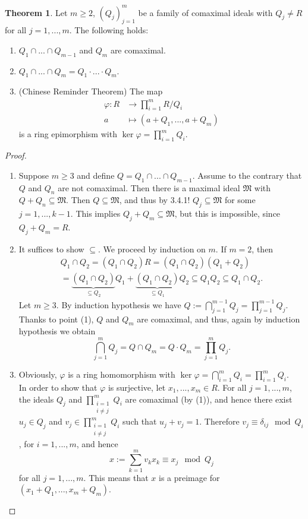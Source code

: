 \documentclass[12pt,a4paper]{report}
\theoremstyle{definition}
\newtheorem{theorem}{Theorem}[chapter] %
\theoremstyle{num.custom-title}
\DeclareMathOperator{\sse}{\subseteq}
\renewcommand{\phi}{\varphi}
\begin{document}
\begin{theorem}
Let $m \geq 2$, $(Q_j)_{j=1}^m$ be a family of comaximal ideals with $Q_j \neq R$ for all $j=1,...,m$. The following holds:
\begin{enumerate}
\item $Q_1 \cap ... \cap Q_{m-1}$ and $Q_m$ are comaximal.
\item $Q_1 \cap ... \cap Q_m = Q_1 \cdot ... \cdot Q_m$.
\item (Chinese Reminder Theorem) The map
\begin{align*}
  \phi \colon R &\to \prod_{i=1}^m R/Q_i\\
   a &\mapsto (a+Q_1,...,a+Q_m)
\end{align*}
is a ring epimorphism with $\ker \phi = \prod_{i=1}^m Q_i$.
\end{enumerate}
\begin{proof}\ 
\begin{enumerate}
\item Suppose $m \geq 3$ and define $Q=Q_1 \cap ... \cap Q_{m-1}$. Assume to the contrary that $Q$ and $Q_n$ are not comaximal. Then there is a maximal ideal $\mathfrak{M}$ with $Q+Q_n \sse \mathfrak{M}$. Then $Q \sse \mathfrak{M}$, and thus by 3.4.1! $Q_j \sse \mathfrak{M}$ for some $j=1,...,k-1$. This implies $Q_j+Q_m \sse \mathfrak{M}$, but this is impossible, since $Q_j+Q_m=R$.
\item It suffices to show $\sse$. We proceed by induction on $m$. If $m=2$, then 
\begin{multline*}
Q_1 \cap Q_2 = (Q_1 \cap Q_2) R = (Q_1 \cap Q_2) (Q_1+Q_2) \\ = \underbrace{(Q_1 \cap Q_2)}_{\sse Q_2} Q_1 + \underbrace{(Q_1 \cap Q_2)}_{\sse Q_1} Q_2 \sse Q_1Q_2 \sse Q_1 \cap Q_2.
\end{multline*}
Let $m \geq 3$. By induction hypothesis we have $Q:= \bigcap_{j=1}^{m-1} Q_j = \prod_{j=1}^{m-1} Q_j$. Thanks to point (1), $Q$ and $Q_m$ are comaximal, and thus, again by induction hypothesis we obtain
\[
\bigcap_{j=1}^m Q_j = Q \cap Q_m = Q \cdot Q_m = \prod_{j=1}^m Q_j.
\]
\item Obviously, $\phi$ is a ring homomorphism with $\ker \phi = \bigcap_{i=1}^m Q_i = \prod_{i=1}^m Q_i$.\\
In order to show that $\phi$ is surjective, let $x_1,...,x_m \in R$. For all $j=1,...,m$, the ideals $Q_j$ and $\prod_{\substack{i=1\\ i \neq j}}^m Q_i$ are comaximal (by (1)), and hence there exist $u_j \in Q_j$ and $v_j \in \prod_{\substack{i=1\\ i \neq j}}^m Q_i$ such that $u_j+v_j=1$. Therefore $v_j \equiv \delta_{ij} \mod Q_i$, for $i=1,...,m$, and hence 
\[
x:= \sum_{k=1}^m v_k x_k \equiv x_j \mod Q_j
\]
for all $j=1,...,m$. This means that $x$ is a preimage for $(x_1+Q_1,...,x_m+Q_m)$.
\end{enumerate}
\end{proof}
\end{theorem}
\end{document}
